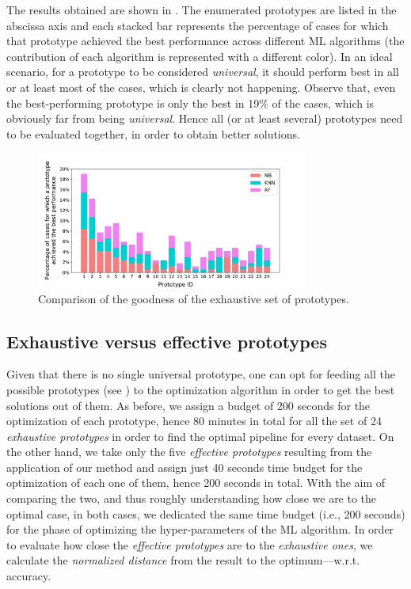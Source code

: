 The results obtained are shown in .
The enumerated prototypes are listed in the abscissa axis and each stacked bar represents the percentage of cases for which that prototype achieved the best performance across different ML algorithms (the contribution of each algorithm is represented with a different color).
In an ideal scenario, for a prototype to be considered \textit{universal}, it should perform best in all or at least most of the cases, which is clearly not happening.
Observe that, even the best-performing prototype is only the best in 19\% of the cases, which is obviously far from being \textit{universal}.
Hence all (or at least several) prototypes need to be evaluated together, in order to obtain better solutions.

\begin{figure}[t]
    \centering
    \includegraphics[width=0.8\textwidth]{chapters/data-centric/supervised/img/evaluation1.pdf}
    \caption{Comparison of the goodness of the exhaustive set of prototypes.}
    \label{fig:eval-universal-pipeline}
\end{figure}

\subsection{Exhaustive versus effective prototypes}
\label{sec:eval-our-vs-rest}
Given that there is no single universal prototype, one can opt for feeding all the possible prototypes (see ) to the optimization algorithm in order to get the best solutions out of them.
As before, we assign a budget of 200 seconds for the optimization of each prototype, hence 80 minutes in total for all the set of 24 \textit{exhaustive prototypes} in order to find the optimal pipeline for every dataset.
On the other hand, we take only the five \textit{effective prototypes} resulting from the application of our method and assign just 40 seconds time budget for the optimization of each one of them, hence 200 seconds in total. With the aim of comparing the two, and thus roughly understanding how close we are to the optimal case, in both cases, we dedicated the same time budget (i.e., 200 seconds) for the phase of optimizing the hyper-parameters of the ML algorithm.
In order to evaluate how close the \textit{effective prototypes} are to the \textit{exhaustive ones}, we calculate the \textit{normalized distance} from the result to the optimum---w.r.t. accuracy.

